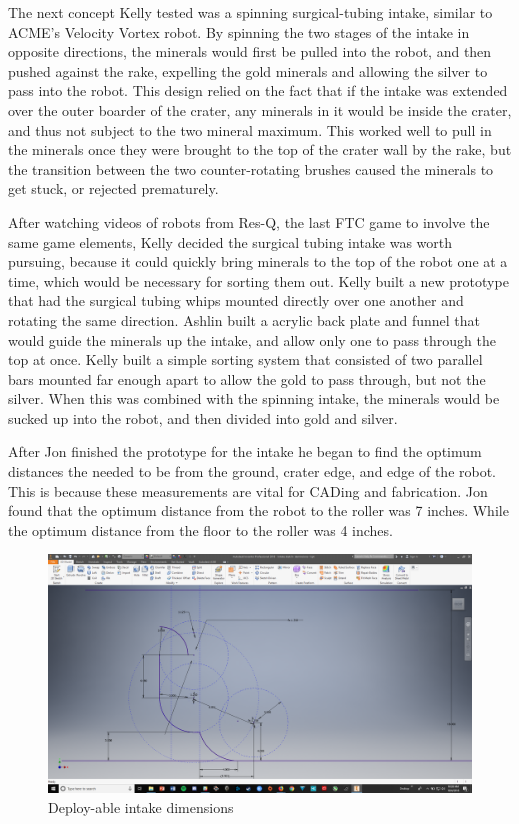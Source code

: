 \documentclass{article}
\begin{document}
The next concept Kelly tested was a spinning surgical-tubing intake, similar to ACME's Velocity Vortex robot. By spinning the two stages of the intake in opposite directions, the minerals would first be pulled into the robot, and then pushed against the rake, expelling the gold minerals and allowing the silver to pass into the robot. This design relied on the fact that if the intake was extended over the outer boarder of the crater, any minerals in it would be inside the crater, and thus not subject to the two mineral maximum. This worked well to pull in the minerals once they were brought to the top of the crater wall by the rake, but the transition between the two counter-rotating brushes caused the minerals to get stuck, or rejected prematurely. 

After watching videos of robots from Res-Q, the last FTC game to involve the same game elements, Kelly decided the surgical tubing intake was worth pursuing, because it could quickly bring minerals to the top of the robot one at a time, which would be necessary for sorting them out. Kelly built a new prototype that had the surgical tubing whips mounted directly over one another and rotating the same direction. Ashlin built a acrylic back plate and funnel that would guide the minerals up the intake, and allow only one to pass through the top at once. Kelly built a simple sorting system that consisted of two parallel bars mounted far enough apart to allow the gold to pass through, but not the silver. When this was combined with the spinning intake, the minerals would be sucked up into the robot, and then divided into gold and silver. 

After Jon finished the prototype for the intake he began to find the optimum distances the needed to be from the ground, crater edge, and edge of the robot. This is because these measurements are vital for CADing and fabrication. Jon found that the optimum distance from the robot to the roller was 7 inches. While the optimum distance from the floor to the roller was 4 inches. 
\begin{figure}
    \centering
    \includegraphics[width=.6\textwidth]{02_09-10/images/intakesketch.png}
    \caption{Deploy-able intake dimensions}
    \label{fig:intake}
\end{figure}
\end{document}
